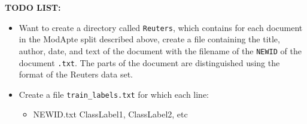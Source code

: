 \documentclass[12pt]{article}
\newcommand{\bt}[1]{\textbf{#1}}
\begin{document}
\begin{framed}
\bt{TODO LIST:}
\begin{itemize}
\item Want to create a directory called {\tt Reuters}, which contains for each document in the ModApte split described above, create a file containing the title, author, date, and text of the document with the filename of the {\tt NEWID} of the document {\tt .txt}. The parts of the document are distinguished using the format of the Reuters data set. 
\item Create a file {\tt train\_labels.txt} for which each line:
\begin{itemize}
	\item NEWID.txt ClassLabel1, ClassLabel2, etc
\end{itemize}
\end{itemize}
\end{framed}

\newpage
\appendix
\end{document}
